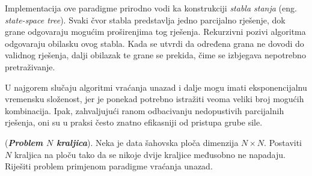 Implementacija ove paradigme prirodno vodi ka konstrukciji \textit{stabla stanja} (eng. \emph{state-space tree}). Svaki čvor stabla predstavlja jedno parcijalno rješenje, dok grane odgovaraju mogućim proširenjima tog rješenja. Rekurzivni pozivi algoritma odgovaraju obilasku ovog stabla. Kada se utvrdi da određena grana ne dovodi do validnog rješenja, dalji obilazak te grane se prekida, čime se izbjegava nepotrebno pretraživanje.

U najgorem slučaju algoritmi vraćanja unazad i dalje mogu imati eksponencijalnu vremensku složenost, jer je ponekad potrebno istražiti veoma veliki broj mogućih kombinacija. Ipak, zahvaljujući ranom odbacivanju nedopustivih parcijalnih rješenja, oni su u praksi često znatno efikasniji od pristupa grube sile.

    
 \begin{example}
 	(\textbf{\emph{Problem $N$ kraljica}}). Neka je data šahovska ploča dimenzija $N \times N$. Postaviti $N$ kraljica na ploču tako da se nikoje dvije kraljice međusobno ne napadaju. Riješiti problem primjenom paradigme vraćanja unazad.
 \end{example}
 
